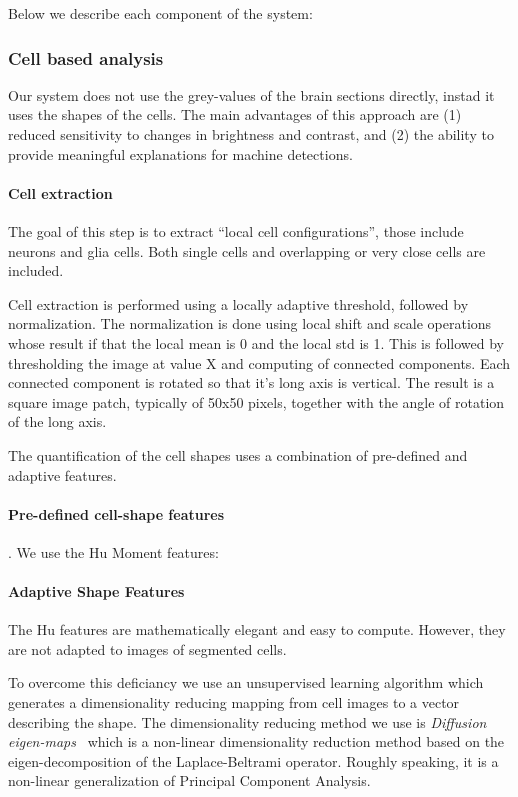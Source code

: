 \documentclass[11pt]{article}
\begin{document}
Below we describe each component of the system:

\subsubsection{Cell based analysis}

Our system does not use the grey-values of the brain sections
directly, instad it uses the shapes of the cells. The main advantages
of this approach are (1) reduced sensitivity to changes in brightness
and contrast, and (2) the ability to provide meaningful explanations
for machine detections.

\paragraph{Cell extraction}
The goal of this step is to extract ``local cell configurations'',
those include neurons and glia cells. Both single cells and overlapping
or very close cells are included.

Cell extraction is performed using a locally adaptive threshold,
followed by normalization. The normalization is done using local
shift and scale operations whose result if that the local mean is 0
and the local std is 1. This is followed by thresholding the image at
value X and computing of connected components. Each connected
component is rotated so that it's long axis is vertical. The result
is a square image patch, typically of 50x50 pixels, together with the
angle of rotation of the long axis.

The quantification of the cell shapes uses a  combination of
pre-defined and adaptive features. 

\paragraph{Pre-defined cell-shape features}.
We use the Hu Moment features:

\paragraph{Adaptive Shape Features}
The Hu features are mathematically elegant and easy to
compute. However, they are not adapted to images of segmented cells.

To overcome this deficiancy we use an unsupervised learning algorithm
which generates a dimensionality reducing mapping from cell images to
a vector describing the shape. The dimensionality reducing method we
use is {\em Diffusion
  eigen-maps}~\cite{belkin2003,coifman2005geometric} which is a
non-linear dimensionality reduction method based on the eigen-decomposition
of the Laplace-Beltrami operator. Roughly speaking, it is a non-linear
generalization of Principal Component Analysis.
\end{document}
